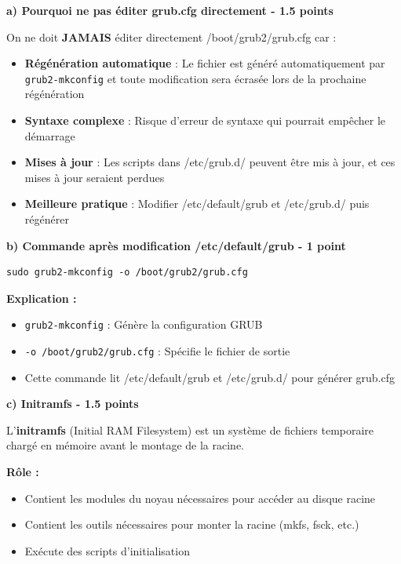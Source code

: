 \documentclass[12pt,a4paper]{article}
\begin{document}
\begin{answerbox}
\textbf{a) Pourquoi ne pas éditer grub.cfg directement - 1.5 points}

On ne doit \textbf{JAMAIS} éditer directement /boot/grub2/grub.cfg car :

\begin{itemize}
    \item \textbf{Régénération automatique} : Le fichier est généré automatiquement par \texttt{grub2-mkconfig} et toute modification sera écrasée lors de la prochaine régénération
    \item \textbf{Syntaxe complexe} : Risque d'erreur de syntaxe qui pourrait empêcher le démarrage
    \item \textbf{Mises à jour} : Les scripts dans /etc/grub.d/ peuvent être mis à jour, et ces mises à jour seraient perdues
    \item \textbf{Meilleure pratique} : Modifier /etc/default/grub et /etc/grub.d/ puis régénérer
\end{itemize}

\textbf{b) Commande après modification /etc/default/grub - 1 point}

\begin{lstlisting}
sudo grub2-mkconfig -o /boot/grub2/grub.cfg
\end{lstlisting}

\textbf{Explication :}
\begin{itemize}
    \item \texttt{grub2-mkconfig} : Génère la configuration GRUB
    \item \texttt{-o /boot/grub2/grub.cfg} : Spécifie le fichier de sortie
    \item Cette commande lit /etc/default/grub et /etc/grub.d/ pour générer grub.cfg
\end{itemize}

\textbf{c) Initramfs - 1.5 points}

L'\textbf{initramfs} (Initial RAM Filesystem) est un système de fichiers temporaire chargé en mémoire avant le montage de la racine.

\textbf{Rôle :}
\begin{itemize}
    \item Contient les modules du noyau nécessaires pour accéder au disque racine
    \item Contient les outils nécessaires pour monter la racine (mkfs, fsck, etc.)
    \item Exécute des scripts d'initialisation
\end{itemize}


\end{answerbox}
\end{document}

